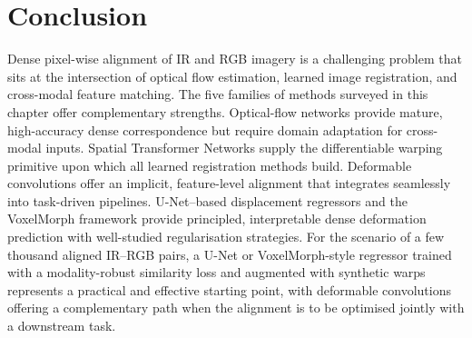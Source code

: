\section{Conclusion}
\label{sec:dense_conclusion}

Dense pixel-wise alignment of IR and RGB imagery is a challenging
problem that sits at the intersection of optical flow estimation,
learned image registration, and cross-modal feature matching.  The five
families of methods surveyed in this chapter offer complementary
strengths.  Optical-flow networks provide mature, high-accuracy dense
correspondence but require domain adaptation for cross-modal inputs.
Spatial Transformer Networks supply the differentiable warping primitive
upon which all learned registration methods build.  Deformable
convolutions offer an implicit, feature-level alignment that integrates
seamlessly into task-driven pipelines.  U-Net--based displacement
regressors and the VoxelMorph framework provide principled,
interpretable dense deformation prediction with well-studied
regularisation strategies.  For the scenario of a few thousand aligned
IR--RGB pairs, a U-Net or VoxelMorph-style regressor trained with a
modality-robust similarity loss and augmented with synthetic warps
represents a practical and effective starting point, with deformable
convolutions offering a complementary path when the alignment is to be
optimised jointly with a downstream task.


